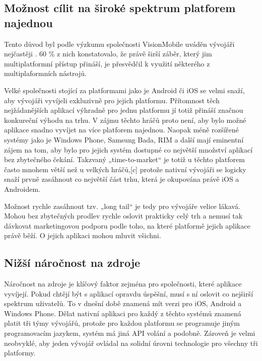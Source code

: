 \subsection{Možnost cílit na široké spektrum platforem najednou}
Tento důvod byl podle výzkumu společnosti VisionMobile uváděn vývojáři nejčastěji \cite{visionmobile_survey}. 60 \% z nich konstatovalo, že právě širší záběr, který jim multiplatformní přístup přináší, je přesvědčil k využití některého z multiplaformních nástrojů.

Velké společnosti stojící za platformami jako je Android či iOS se velmi snaží, aby vývojáři vyvíjeli exkluzivně pro jejich platformu. Přítomnost těch nejžádanějších aplikací výhradně pro jednu platformu jí totiž přináší značnou konkureční výhodu na trhu. V zájmu těchto hráčů proto není, aby bylo možné aplikace snadno vyvíjet na více platforem najednou. Naopak méně rozšířené systémy jako je Windows Phone, Samsung Bada, RIM a další mají eminentní zájem na tom, aby bylo pro jejich systém dostupné co největší množství aplikací bez zbytečného čekání. Takzvaný „time-to-market“ je totiž u těchto platforem často mnohem větší než u velkých hráčů,[c] protože nativní vývojáři se logicky snaží prvně zasáhnout co největší část trhu, která je okupována právě iOS a Androidem. 

Možnost rychle zasáhnout tzv. „long tail“ je tedy pro vývojáře velice lákavá. Mohou bez zbytečných prodlev rychle oslovit prakticky celý trh a nemusí tak dávkovat marketingovou podporu podle toho, na které platformě jejich aplikace právě běží. O jejich aplikaci mohou mluvit všichni.

\subsection{Nižší náročnost na zdroje}
Náročnost na zdroje je klíčový faktor zejména pro společnosti, které aplikace vyvíjejí. Pokud chtějí být s aplikací opravdu úspěšní, musí s ní oslovit co nejširší spektrum uživatelů. To v dnešní době znamená mít verzi pro iOS, Android a Windows Phone. Dělat nativní aplikaci pro každý z těchto systémů znamená platit tři týmy vývojářů, protože pro každou platformu se programuje jiným programovacím jazykem, systém má jiná API volání a podobně. Zároveň je velmi neobvyklé, aby jeden vývojář ovládal na solidní úrovni technologie pro všechny tři platformy.

